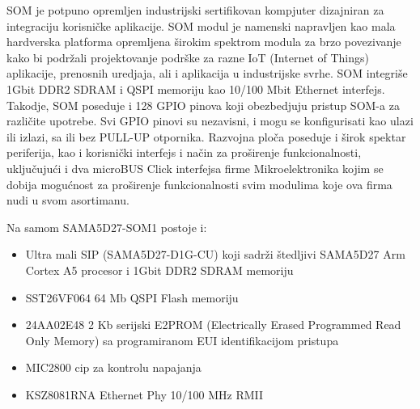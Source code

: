 \documentclass[a4paper,12pt, master]{etf}
\begin{document}

	SOM je potpuno opremljen industrijski sertifikovan kompjuter dizajniran za integraciju
	korisni\v{c}ke aplikacije. SOM modul je namenski napravljen kao mala hardverska platforma
	opremljena \v{s}irokim spektrom modula za brzo povezivanje kako bi podr\v{z}ali
	projektovanje podr\v{s}ke za razne IoT (Internet of Things) aplikacije, prenosnih uredjaja,
	ali i aplikacija u industrijske svrhe. SOM integri\v{s}e 1Gbit DDR2 SDRAM i QSPI memoriju
	kao 10/100 Mbit Ethernet interfejs. Takodje, SOM poseduje i 128 GPIO pinova
	koji obezbedjuju pristup SOM-a za razli\v{c}ite upotrebe. Svi GPIO pinovi su nezavisni, i
	mogu se konfigurisati kao ulazi	ili izlazi, sa ili bez PULL-UP otpornika. Razvojna plo\v{c}a
	poseduje  i \v{s}irok spektar periferija, kao i korisni\v{c}ki interfejs i na\v{c}in za
	pro\v{s}irenje funkcionalnosti, uklju\v{c}uju\'{c}i i dva microBUS Click interfejsa firme
	Mikroelektronika kojim se dobija mogu\'{c}nost za pro\v{s}irenje funkcionalnosti svim
	modulima koje ova firma nudi u svom asortimanu.


	Na samom SAMA5D27-SOM1 postoje i:
	\begin{itemize}
		\item Ultra mali SIP (SAMA5D27-D1G-CU) koji sadr\v{z}i \v{s}tedljivi SAMA5D27 Arm Cortex
		A5 procesor i 1Gbit DDR2 SDRAM memoriju
		\item SST26VF064 64 Mb QSPI Flash memoriju
		\item 24AA02E48 2 Kb serijski E2PROM (Electrically Erased Programmed Read Only Memory)
		sa programiranom EUI identifikacijom pristupa
		\item MIC2800 cip za kontrolu napajanja
		\item KSZ8081RNA Ethernet Phy 10/100 MHz RMII
	\end{itemize}

\end{document}
